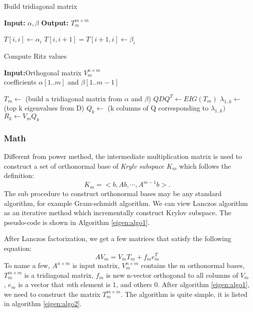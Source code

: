 \begin{algorithm}
\caption{Build tridiagonal matrix}
{\bf Input:} $\alpha, \beta$
{\bf Output:} $T^{m\times m}_{m}$
\begin{algorithmic}[1]
	\STATE $T[i, i] \leftarrow \alpha_{i} $
	\STATE $T[i, i+1] = T[i+1, i] \leftarrow \beta_{i}$
\ENDFOR	
\end{algorithmic}
\label{eigen:algo2}
\end{algorithm}

\begin{algorithm}
\caption{Compute Ritz values}
{\bf Input:}Orthogonal matrix $V^{n\times m}_{m}$\\
coefficients $\alpha[1..m]$ and $\beta[1..m-1]$
\begin{algorithmic}[1]
\STATE $T_{m} \leftarrow$ (build a tridiagonal matrix from $\alpha$ and $\beta$)
\STATE $QDQ^{T} \leftarrow EIG(T_{m})$
\STATE $\lambda_{1..k} \leftarrow$ (top k eigenvalues from D)
\STATE $Q_{k} \leftarrow $ (k columns of Q corresponding to $\lambda_{1..k})$
\STATE $R_{k} \leftarrow V_{m}Q_{k}$
\end{algorithmic}
\label{eigen:algo3}
\end{algorithm}

\subsubsection{Math}
Different from power method, the intermediate multiplication matrix is used to construct a set of orthonormal base of \emph{Krylv subspace $K_{m}$} which follows the definition:
\begin{equation}
K_{m} = < b, Ab, \cdots, A^{m-1}b>.
\end{equation}
The sub procedure to construct orthonormal bases may be any standard algorithm, for example Gram-schmidt algorithm. We can view Lanczos algorithm as an iterative method which incrementally construct Krylov subspace. The pseudo-code is shown in Algorithm \ref{eigen:algo1}.

After Lanczos factorization, we get a few matrices that satisfy the following equation:
\begin{equation}
	AV_{m} = V_{m}T_{m} + f_{m}e^{T}_{m}
\end{equation}
To name a few, $A^{n\times m}$ is input matrix, $V^{n\times m}_{m}$ contains the m orthonormal bases, $T^{m\times m}_{m}$ is a tridiagonal matrix, $f_{m}$ is new n-vector orthogonal to all columns of $V_{m}$, $
e_{m}$ is a vector that \emph{m}th element is 1, and others 0. After algorithm \ref{eigen:algo1}, we need to construct the matrix $T^{m\times m}_{m}$. The algorithm is quite simple, it is listed in algorithm \ref{eigen:algo2}. 

